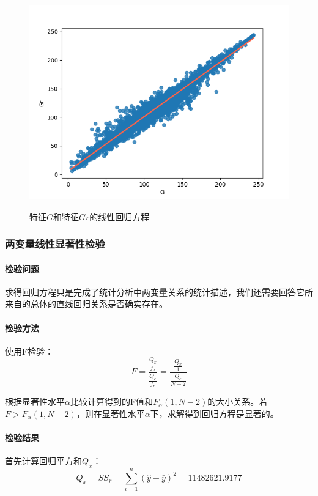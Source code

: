 \documentclass[UTF8]{ctexart}
\begin{document}
	\begin{figure}[htbp]
		\centering
		\caption{特征$G$和特征$Gr$的线性回归方程}
		\includegraphics[width=1.0\textwidth]{scatter_g_gr_line.png}
		\label{Fig.28}
	\end{figure}

	\subsubsection{两变量线性显著性检验}
	
	\paragraph{检验问题} 求得回归方程只是完成了统计分析中两变量关系的统计描述，我们还需要回答它所来自的总体的直线回归关系是否确实存在。
	
	\paragraph{检验方法} 使用F检验：
	\begin{equation*}
	F = \frac{\frac{Q_x}{f_x}}{\frac{Q_e}{f_e}} = \frac{\frac{Q_x}{1}}{\frac{Q_e}{N-2}}
	\end{equation*}
	
	根据显著性水平$\alpha$比较计算得到的F值和$F_{\alpha}(1, N - 2)$的大小关系。若$F > F_{\alpha}(1, N - 2)$，则在显著性水平$\alpha$下，求解得到回归方程是显著的。
	
	\paragraph{检验结果} 首先计算回归平方和$Q_x$：
	\begin{equation*}
	Q_x = SS_r = \sum\limits_{i=1}^{n}(\hat{y} - \bar{y})^2 = 11482621.9177
	\end{equation*}
	
\end{document}
